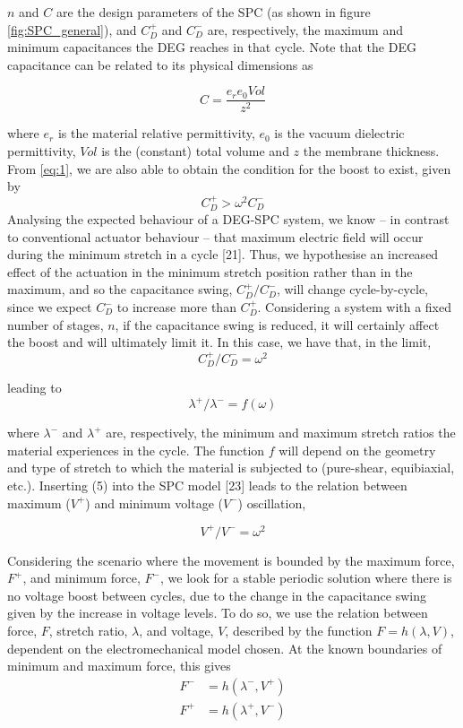 $n$ and $C$ are the design parameters of the SPC (as shown in figure \ref{fig:SPC_general}), and $C_D^{+}$ and $C_D^{-}$ are, respectively, the maximum and minimum capacitances the DEG reaches in that cycle. Note that the DEG capacitance can be related to its physical dimensions as

\begin{equation}
C=\frac{e_r e_0 Vol}{z^2}
\end{equation}

where $e_r$ is the material relative permittivity, $e_0$ is the vacuum dielectric permittivity, $Vol$ is the (constant) total volume and $z$ the membrane thickness.
From \ref{eq:1}, we are also able to obtain the condition for the boost to exist, given by 
\begin{equation}
C_D^{+}>\omega^2 C_D^{-}
\end{equation}
Analysing the expected behaviour of a DEG-SPC system, we know – in contrast to conventional actuator behaviour – that maximum electric field will occur during the minimum stretch in a cycle [21]. Thus, we hypothesise an increased effect of the actuation in the minimum stretch position rather than in the maximum, and so the capacitance swing, $C_D^{+}/C_D^{-}$, will change cycle-by-cycle, since we expect $C_D^{-}$ to increase more than $C_D^{+}$. Considering a system with a fixed number of stages, $n$, if the capacitance swing is reduced, it will certainly affect the boost and will ultimately limit it. In this case, we have that, in the limit,
\begin{equation}
C_D^{+}/C_D^{-}= \omega^2
\end{equation}

leading to 
\begin{equation}
\lambda^+/\lambda^- =f(\omega)
\end{equation}

where $\lambda^-$ and $\lambda^+$ are, respectively, the minimum and maximum stretch ratios the material experiences in the cycle. The function $f$ will depend on the geometry and type of stretch to which the material is subjected to (pure-shear, equibiaxial, etc.).
Inserting (5) into the SPC model [23] leads to the relation between maximum ($V^+$) and minimum voltage ($V^-$) oscillation,

\begin{equation}
V^+/V^- = \omega^2
\end{equation}

Considering the scenario where the movement is bounded by the maximum force, $F^+$, and minimum force, $F^-$, we look for a stable periodic solution where there is no voltage boost between cycles, due to the change in the capacitance swing given by the increase in voltage levels. To do so, we use the relation between force, $F$, stretch ratio, $\lambda$, and voltage, $V$, described by the function $F= h(\lambda,V)$, dependent on the electromechanical model chosen. At the known boundaries of minimum and maximum force, this gives
\begin{align}
F^-&=  h(\lambda^-,V^+)\\
F^+&=  h(\lambda^+,V^-) 
\end{align}

